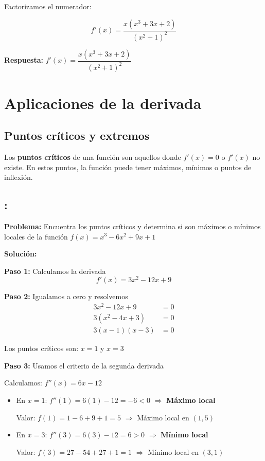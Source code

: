 \documentclass[12pt,a4paper]{article}
\begin{document}
Factorizamos el numerador:

\[
f'(x) = \frac{x(x^3 + 3x + 2)}{(x^2 + 1)^2}
\]

\textbf{Respuesta:} $\boxed{f'(x) = \dfrac{x(x^3 + 3x + 2)}{(x^2 + 1)^2}}$

\section{Aplicaciones de la derivada}

\subsection*{Puntos críticos y extremos}

Los \textbf{puntos críticos} de una función son aquellos donde $f'(x) = 0$ o $f'(x)$ no existe. En estos puntos, la función puede tener máximos, mínimos o puntos de inflexión.

\subsection*{{\color{blue!40!red}{Ejemplo 6}}: \color{blue!80!black}{Encontrar máximos y mínimos}}

\textbf{Problema:} Encuentra los puntos críticos y determina si son máximos o mínimos locales de la función $f(x) = x^3 - 6x^2 + 9x + 1$

\bigskip

\textbf{Solución:}

\textbf{Paso 1:} Calculamos la derivada
\[
f'(x) = 3x^2 - 12x + 9
\]

\textbf{Paso 2:} Igualamos a cero y resolvemos
\begin{align*}
3x^2 - 12x + 9 &= 0 \\
3(x^2 - 4x + 3) &= 0 \\
3(x - 1)(x - 3) &= 0
\end{align*}

Los puntos críticos son: $\boxed{x = 1 \text{ y } x = 3}$

\textbf{Paso 3:} Usamos el criterio de la segunda derivada

Calculamos: $f''(x) = 6x - 12$

\begin{itemize}
	\item En $x = 1$: $f''(1) = 6(1) - 12 = -6 < 0$ $\Rightarrow$ \textbf{Máximo local}

	Valor: $f(1) = 1 - 6 + 9 + 1 = 5$ $\Rightarrow$ Máximo local en $(1, 5)$

	\item En $x = 3$: $f''(3) = 6(3) - 12 = 6 > 0$ $\Rightarrow$ \textbf{Mínimo local}

	Valor: $f(3) = 27 - 54 + 27 + 1 = 1$ $\Rightarrow$ Mínimo local en $(3, 1)$
\end{itemize}
\end{document}

